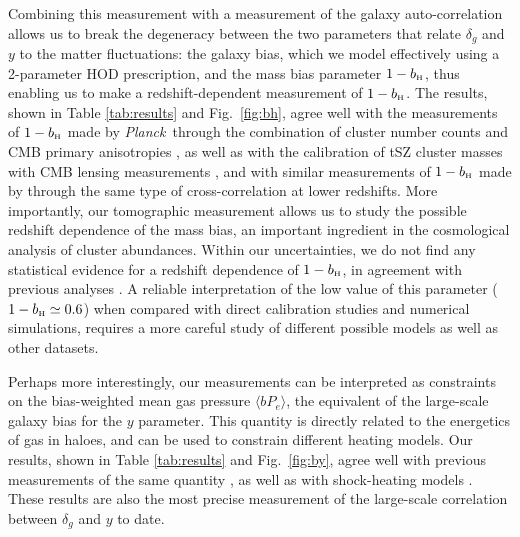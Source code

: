 \documentclass[useAMS,usenatbib]{mn2e}
\def\bH{b_{\scriptscriptstyle\rm H}}
\def\planck{{\it Planck\/}}
\begin{document}
  Combining this measurement with a measurement of the galaxy auto-correlation allows us to break the degeneracy between the two parameters that relate $\delta_g$ and $y$ to the matter fluctuations: the galaxy bias, which we model effectively using a 2-parameter HOD prescription, and the mass bias parameter $1-\bH$, thus enabling us to make a redshift-dependent measurement of $1-\bH$. The results, shown in Table \ref{tab:results} and Fig.\!~\ref{fig:bh}, agree well with the measurements of $1-\bH$ made by \planck\ through the combination of cluster number counts and CMB primary anisotropies \citep{2016A&A...594A..24P}, as well as with the calibration of tSZ cluster masses with CMB lensing measurements \citep{2019arXiv190407887Z}, and with similar measurements of $1-\bH$ made by \cite{2018MNRAS.480.3928M} through the same type of cross-correlation at lower redshifts. More importantly, our tomographic measurement allows us to study the possible redshift dependence of the mass bias, an important ingredient in the cosmological analysis of cluster abundances. Within our uncertainties, we do not find any statistical evidence for a redshift dependence of $1-\bH$, in agreement with previous analyses \citep{2019A&A...626A..27S}. A reliable interpretation of the low value of this parameter ($1-\bH\simeq0.6$) when compared with direct calibration studies and numerical simulations, requires a more careful study of different possible models as well as other datasets.
  
  Perhaps more interestingly, our measurements can be interpreted as constraints on the bias-weighted mean gas pressure $\langle bP_e\rangle$, the equivalent of the large-scale galaxy bias for the $y$ parameter. This quantity is directly related to the energetics of gas in haloes, and can be used to constrain different heating models. Our results, shown in Table \ref{tab:results} and Fig.\!~\ref{fig:by}, agree well with previous measurements of the same quantity \citep{2017MNRAS.467.2315V,2019arXiv190413347P}, as well as with shock-heating models \citep{2012ApJ...758...75B}. These results are also the most precise measurement of the large-scale correlation between $\delta_g$ and $y$ to date.
\end{document}
